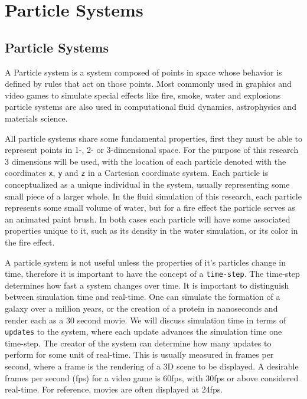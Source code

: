 \chapter{Particle Systems}

\section{Particle Systems}
A Particle system is a system composed of points in space whose behavior is
defined by rules that act on those points. Most commonly used in graphics and
video games to simulate special effects like fire, smoke, water and explosions
particle systems are also used in computational fluid dynamics, astrophysics
and materials science.

\begin{comment}
\begin{figure}[!htc]
		\texttt{[image: figures/pretty\_particles.png]}
		\label{fig:logic}
        \caption{ pretty particle system picture }
\end{figure}
\end{comment}


All particle systems share some fundamental properties, first they must be able
to represent points in 1-, 2- or 3-dimensional space. For the purpose of this
research  3 dimensions will be used, with the location of each particle 
denoted with the coordinates \verb|x|, \verb|y| and \verb|z| in a Cartesian coordinate system. Each particle is
conceptualized as a unique individual in the system, usually representing some
small piece of a larger whole. In the fluid simulation of this research, each
particle represents some small volume of water, but for a fire effect the
particle serves as an animated paint brush. In both cases each particle will
have some associated properties unique to it, such as its density in the water
simulation, or its color in the fire effect.


A particle system is not useful unless the properties of it's particles change
in time, therefore it is important to have the concept of a \verb|time-step|.
The time-step determines how fast a system changes over time. It is important
to distinguish between simulation time and real-time. One can simulate the
formation of a galaxy over a million years, or the creation of a protein in
nanoseconds and render each as a 30 second movie. We will discuss simulation
time in terms of \verb|updates| to the system, where each update advances the
simulation time one time-step. The creator of the system can determine how many
updates to perform for some unit of real-time. This is usually measured in
frames per second, where a frame is the rendering of a 3D scene to be
displayed. A desirable frames per second (fps) for a video game is 60fps, with
30fps or above considered real-time. For reference, movies are often displayed
at 24fps. 


